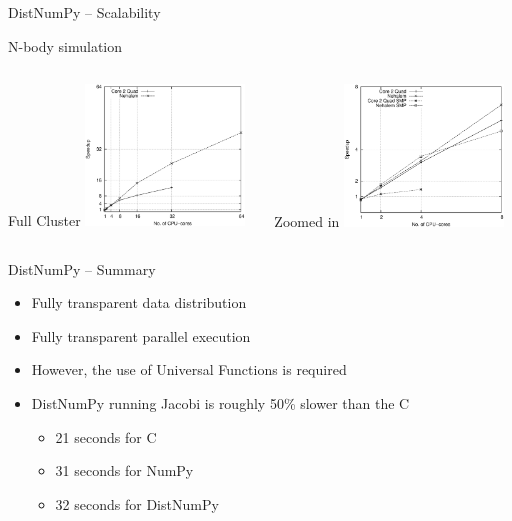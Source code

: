 \documentclass{beamer}
\begin{document}
\begin{frame}{DistNumPy -- Scalability}
\begin{center}
N-body simulation
\end{center}

\begin{columns}
  \begin{column}{0.5\textwidth}
  \begin{center}
    \hspace{21px}Full Cluster
    \includegraphics[width=160px]{../gfx/NbodyStrong}
  \end{center}    
  \end{column}
  \begin{column}{0.5\textwidth}
  \begin{center}
    \hspace{23px}Zoomed in
    \includegraphics[width=160px]{../gfx/NbodyStrongSMP}
  \end{center}
  \end{column}
\end{columns}
\end{frame}


\begin{frame}{DistNumPy -- Summary}
\begin{itemize}
  \item Fully transparent data distribution
  \item Fully transparent parallel execution
  \item However, the use of Universal Functions is required
  \item DistNumPy running Jacobi is roughly 50\% slower than the C
  \begin{itemize}  
    \item 21 seconds for C
    \item 31 seconds for NumPy
    \item 32 seconds for DistNumPy
  \end{itemize}
\end{itemize}
\end{frame}
\end{document}
